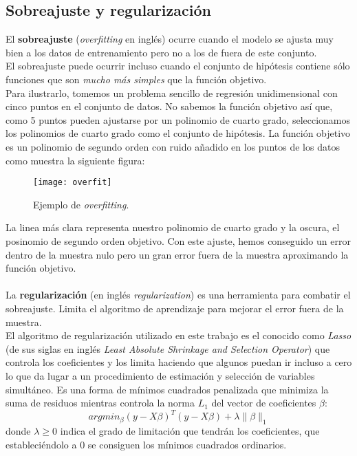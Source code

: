 \subsection{Sobreajuste y regularización}
El \textbf{sobreajuste} (\textit{overfitting} en inglés) ocurre cuando el modelo se ajusta muy bien a los datos de entrenamiento pero no a los de fuera de este conjunto.\\
El sobreajuste puede ocurrir incluso cuando el conjunto de hipótesis contiene sólo funciones que son \textit{mucho más simples} que la función objetivo. \cite{abu2012learning}\\
Para ilustrarlo, tomemos un problema sencillo de regresión unidimensional con cinco puntos en el conjunto de datos. No sabemos la función objetivo así que, como 5 puntos pueden ajustarse por un polinomio de cuarto grado, seleccionamos los polinomios de cuarto grado como el conjunto de hipótesis. La función objetivo es un polinomio de segundo orden con ruido añadido en los puntos de los datos como muestra la siguiente figura:
\begin{figure}[H]
  \centering
  \texttt{[image: overfit]}
  \caption{Ejemplo de \textit{overfitting}. \cite{abu2012learning}}
  \label{fig:overfit}
\end{figure}
\begin{center}
\end{center}
La linea más clara representa nuestro polinomio de cuarto grado y la oscura, el posinomio de segundo orden objetivo. Con este ajuste, hemos conseguido un error dentro de la muestra nulo pero un gran error fuera de la muestra aproximando la función objetivo.\\\\
La \textbf{regularización} (en inglés \textit{regularization}) es una herramienta para combatir el sobreajuste. Limita el algoritmo de aprendizaje para mejorar el error fuera de la muestra.\\
El algoritmo de regularización utilizado en este trabajo es el conocido como \textit{Lasso} (de sus siglas en inglés \textit{Least Absolute Shrinkage and Selection Operator}) que controla los coeficientes y los limita haciendo que algunos puedan ir incluso a cero lo que da lugar a un procedimiento de estimación y selección de variables simultáneo. Es una forma de mínimos cuadrados penalizada que minimiza la suma de residuos mientras controla la norma $L_{1}$ del vector de coeficientes $\beta$:
\[ argmin_{\beta}(y-X\beta)^{T}(y-X\beta) + \lambda \parallel \beta \parallel_{1} \]
donde $\lambda \geq 0$ indica el grado de limitación que tendrán los coeficientes, que estableciéndolo a 0 se consiguen los mínimos cuadrados ordinarios.
\cite{hans2009bayesian}
